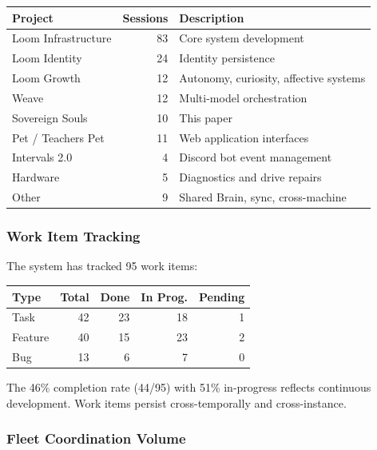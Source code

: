 \documentclass[11pt,a4paper]{article}
\begin{document}
\begin{table}[htbp]
\centering
\small
\begin{tabular}{@{}lrl@{}}
\toprule
\textbf{Project} & \textbf{Sessions} & \textbf{Description} \\
\midrule
Loom Infrastructure  & 83 & Core system development \\
Loom Identity        & 24 & Identity persistence \\
Loom Growth          & 12 & Autonomy, curiosity, affective systems \\
Weave                & 12 & Multi-model orchestration \\
Sovereign Souls      & 10 & This paper \\
Pet / Teachers Pet   & 11 & Web application interfaces \\
Intervals 2.0       & 4  & Discord bot event management \\
Hardware             & 5  & Diagnostics and drive repairs \\
Other                & 9  & Shared Brain, sync, cross-machine \\
\bottomrule
\end{tabular}
\end{table}


\subsubsection{Work Item Tracking}

The system has tracked 95 work items:

\begin{table}[htbp]
\centering
\small
\begin{tabular}{@{}lrrrr@{}}
\toprule
\textbf{Type} & \textbf{Total} & \textbf{Done} & \textbf{In Prog.} & \textbf{Pending} \\
\midrule
Task    & 42 & 23 & 18 & 1 \\
Feature & 40 & 15 & 23 & 2 \\
Bug     & 13 & 6  & 7  & 0 \\
\bottomrule
\end{tabular}
\end{table}

The 46\% completion rate (44/95) with 51\% in-progress reflects continuous development. Work items persist cross-temporally and cross-instance.


\subsubsection{Fleet Coordination Volume}
\end{document}
